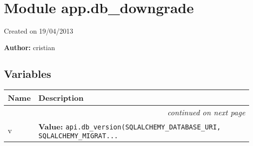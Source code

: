 %
%
%


\section{Module app.db\_downgrade}

    \label{app:db_downgrade}
Created on 19/04/2013

\textbf{Author:} cristian





  \subsection{Variables}

    \vspace{-1cm}
\hspace{\varindent}\begin{longtable}{|p{\varnamewidth}|p{\vardescrwidth}|l}
\cline{1-2}
\cline{1-2} \centering \textbf{Name} & \centering \textbf{Description}& \\
\cline{1-2}
\endhead\cline{1-2}\multicolumn{3}{r}{\small\textit{continued on next page}}\\\endfoot\cline{1-2}
\endlastfoot\raggedright v\- & \raggedright \textbf{Value:} 
{\tt api.db\_version(SQLALCHEMY\_DATABASE\_URI, SQLALCHEMY\_MIGRAT\texttt{...}}&\\
\cline{1-2}
\end{longtable}

